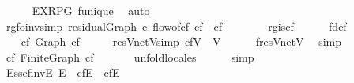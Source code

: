 \begin{isabellebody}
%
\isadelimproof
\ \ \ \ %
\endisadelimproof
%
\isatagproof
{}\isamarkupfalse%
\ EX{\isacharunderscore}RPG\ f{\isacharunderscore}unique\ \isamarkupfalse%
\ auto%
\endisatagproof
{\isafoldproof}%
%
\isadelimproof
\isanewline
%
\endisadelimproof
\isanewline
\ \ \isamarkupfalse%
\ rg{\isacharunderscore}fo{\isacharunderscore}inv{\isacharbrackleft}simp{\isacharbrackright}{\isacharcolon}\ {\isachardoublequoteopen}residualGraph\ c\ {\isacharparenleft}flow{\isacharunderscore}of{\isacharunderscore}cf\ cf{\isacharparenright}\ {\isacharequal}\ cf{\isachardoublequoteclose}\ \ \isanewline
%
\isadelimproof
\ \ \ \ %
\endisadelimproof
%
\isatagproof
{}\isamarkupfalse%
\ rg{\isacharunderscore}is{\isacharunderscore}cf\isanewline
\ \ \ \ \isamarkupfalse%
\ f{\isacharunderscore}def\isanewline
\ \ \ \ \isacommand{{\isachardot}}\isamarkupfalse%
%
\endisatagproof
{\isafoldproof}%
%
\isadelimproof
\isanewline
%
\endisadelimproof
\ \ \ \ \isanewline
\isanewline
\ \ \isamarkupfalse%
\ cf{\isacharcolon}\ Graph\ cf%
\isadelimproof
\ %
\endisadelimproof
%
\isatagproof
\isacommand{{\isachardot}}\isamarkupfalse%
%
\endisatagproof
{\isafoldproof}%
%
\isadelimproof
%
\endisadelimproof
\isanewline
\isanewline
\ \ \isamarkupfalse%
\ resV{\isacharunderscore}netV{\isacharbrackleft}simp{\isacharbrackright}{\isacharcolon}\ {\isachardoublequoteopen}cf{\isachardot}V\ {\isacharequal}\ V{\isachardoublequoteclose}\isanewline
%
\isadelimproof
\ \ \ \ %
\endisadelimproof
%
\isatagproof
{}\isamarkupfalse%
\ f{\isachardot}resV{\isacharunderscore}netV\ \isamarkupfalse%
\ simp%
\endisatagproof
{\isafoldproof}%
%
\isadelimproof
\isanewline
%
\endisadelimproof
\isanewline
\ \ \isamarkupfalse%
\ cf{\isacharcolon}\ Finite{\isacharunderscore}Graph\ cf\ \isanewline
%
\isadelimproof
\ \ \ \ %
\endisadelimproof
%
\isatagproof
{}\isamarkupfalse%
\ unfold{\isacharunderscore}locales\isanewline
\ \ \ \ \isamarkupfalse%
\ simp\isanewline
\ \ \ \ \isamarkupfalse%
%
\endisatagproof
{\isafoldproof}%
%
\isadelimproof
\isanewline
%
\endisadelimproof
\isanewline
\ \ \isamarkupfalse%
\ E{\isacharunderscore}ss{\isacharunderscore}cfinvE{\isacharcolon}\ {\isachardoublequoteopen}E\ {\isasymsubseteq}\ cf{\isachardot}E\ {\isasymunion}\ cf{\isachardot}E{\isasyminverse}{\isachardoublequoteclose}\ \ \isanewline
%
\isadelimproof
\ \ \ \ %
\endisadelimproof
%
\isatagproof
{}\isamarkupfalse%

\end{isabellebody}
